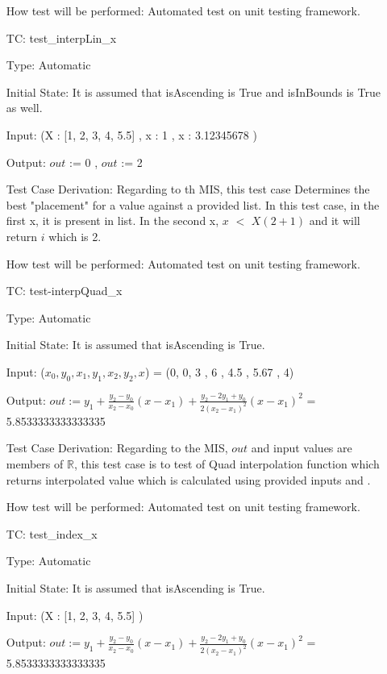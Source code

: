 \documentclass[12pt]{article}
\newcounter{utestnum} %
\begin{document}
\begin{enumerate}[label=TC\arabic*:,ref={\arabic*}]
	How test will be performed: Automated test on unit testing framework.

	
	\item [TC\refstepcounter{utestnum}\theutestnum: \label{interpLinTest}] 
	test\_interpLin\_x
	
	Type: Automatic
	
	Initial State: It is assumed that isAscending is True and isInBounds is True as well.
	
	Input: (X : [1, 2, 3, 4, 5.5] , x : 1 , x : 3.12345678 )
	
	Output: $out$ := 0 , $out$ := 2
	
	Test Case Derivation: Regarding to th MIS, this test case Determines the best "placement" for a value against a provided list. In this test case, in the first x, it is present in list. In the second x, $x$ $<$ $X(2+1)$ and it will return $i$ which is 2.
	
	How test will be performed: Automated test on unit testing framework.
	
		
		\item [TC\refstepcounter{utestnum}\theutestnum: \label{interpQuadTest}] 
	test-interpQuad\_x
	
	Type: Automatic
	
	Initial State: It is assumed that isAscending is True.
	
	Input: ($x_0, y_0, x_1, y_1, x_2, y_2, x$) = (0, 0, 3 , 6 , 4.5 , 5.67 , 4)
	
	Output: $out := y_1 + \frac{y_2 - y_0}{x_2-x_0} (x - x_1) + \frac{y_2 - 2 y_1 + y_0}{2
		(x_2-x_1)^2} (x - x_1)^2$ = 5.8533333333333335
	
	Test Case Derivation: Regarding to the MIS, $out$ and input values are members of $\mathbb{R}$, this test case is to test of Quad interpolation function which returns interpolated value which is calculated using provided inputs and .
	
	How test will be performed: Automated test on unit testing framework.
	
	\item [TC\refstepcounter{utestnum}\theutestnum: \label{indexTest}] 
	test\_index\_x
	
	Type: Automatic
	
	Initial State: It is assumed that isAscending is True.
	
	Input: (X : [1, 2, 3, 4, 5.5] )
	
	Output: $out := y_1 + \frac{y_2 - y_0}{x_2-x_0} (x - x_1) + \frac{y_2 - 2 y_1 + y_0}{2
		(x_2-x_1)^2} (x - x_1)^2$ = 5.8533333333333335
	

\end{enumerate}
\end{document}
